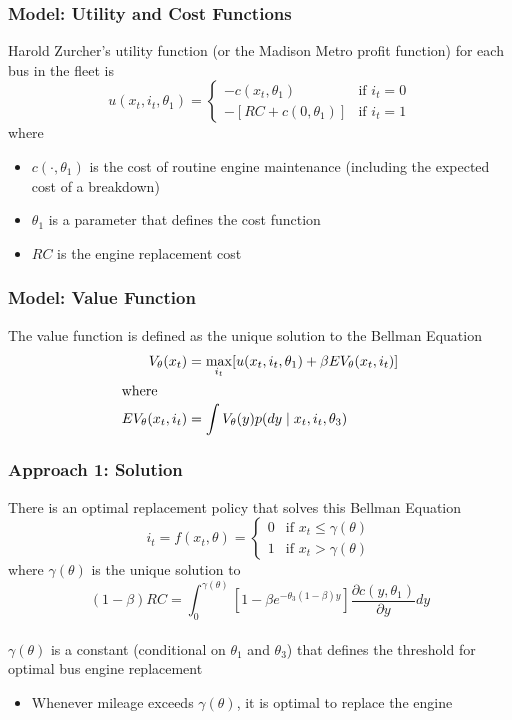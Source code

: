 \documentclass{beamer}
\begin{document}
\begin{frame}\frametitle{Model: Utility and Cost Functions}
    Harold Zurcher's utility function (or the Madison Metro profit function) for each bus in the fleet is
    $$u(x_t, i_t, \theta_1) = 
    	\begin{cases}
    		-c(x_t, \theta_1) & \text{if } i_t = 0 \\
    		-[RC + c(0, \theta_1)] & \text{if } i_t = 1
    	\end{cases}$$
    where
    \begin{itemize}
    	\item $c(\cdot, \theta_1)$ is the cost of routine engine maintenance (including the expected cost of a breakdown)
    	\item $\theta_1$ is a parameter that defines the cost function
    	\item $RC$ is the engine replacement cost
    \end{itemize}
\end{frame}

\begin{frame}\frametitle{Model: Value Function}
    The value function is defined as the unique solution to the Bellman Equation
    \begin{align*}
    	V_{\theta}(x_t) &= \max_{i_t} [u(x_t, i_t, \theta_1) + \beta EV_{\theta}(x_t, i_t)] \\
    	\intertext{where}
    	EV_{\theta}(x_t, i_t) &= \int V_{\theta}(y) p(dy \mid x_t, i_t, \theta_3)
    \end{align*}
\end{frame}

\begin{frame}\frametitle{Approach 1: Solution}
    There is an optimal replacement policy that solves this Bellman Equation
    $$i_t = f(x_t, \theta) = 
    	\begin{cases}
    		0 & \text{if } x_t \leq \gamma(\theta) \\
    		1 & \text{if } x_t > \gamma(\theta)
    	\end{cases}$$
    where $\gamma(\theta)$ is the unique solution to
    $$(1 - \beta) RC = \int_0^{\gamma(\theta)} \left[ 1 - \beta e^{-\theta_3 (1 - \beta) y} \right] \frac{\partial c(y, \theta_1)}{\partial y} dy$$ \\
    \vspace{2ex}
    $\gamma(\theta)$ is a constant (conditional on $\theta_1$ and $\theta_3$) that defines the threshold for optimal bus engine replacement
    \begin{itemize}
    	\item Whenever mileage exceeds $\gamma(\theta)$, it is optimal to replace the engine
    \end{itemize}
\end{frame}
\end{document}
